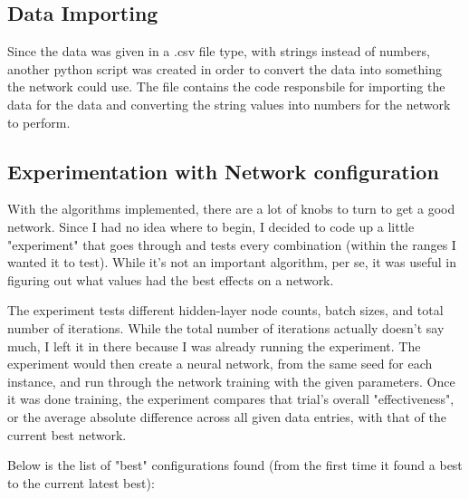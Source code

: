 \documentclass[10pt]{article}
\begin{document}
\subsection{Data Importing}
Since the data was given in a .csv file type, with strings instead of numbers, another python script was created in order to convert the data into something the network could use. The file  contains the code responsbile for importing the data for the data and converting the string values into numbers for the network to perform.
\subsection{Experimentation with Network configuration}
With the algorithms implemented, there are a lot of knobs to turn to get a good network. Since I had no idea where to begin, I decided to code up a little "experiment" that goes through and tests every combination (within the ranges I wanted it to test). While it's not an important algorithm, per se, it was useful in figuring out what values had the best effects on a network.\par
The experiment tests different hidden-layer node counts, batch sizes, and total number of iterations. While the total number of iterations actually doesn't say much, I left it in there because I was already running the experiment. The experiment would then create a neural network, from the same seed for each instance, and run through the network training with the given parameters. Once it was done training, the experiment compares that trial's overall "effectiveness", or the average absolute difference across all given data entries, with that of the current best network.\par
Below is the list of "best" configurations found (from the first time it found a best to the current latest best):\par
\end{document}
